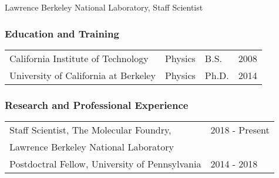 Lawrence Berkeley National Laboratory,
Staff Scientist

\subsubsection*{Education and Training}

\begin{table}[ht]
    \centering
    \begin{tabular}{llll}
        California Institute of Technology & Physics & B.S. & 2008 \\
        University of California at Berkeley & Physics & Ph.D. & 2014 \\
    \end{tabular}
\end{table}

\subsubsection*{Research and Professional Experience}

\begin{table}[ht]
    \centering
    \begin{tabular}{ll}
        Staff Scientist, The Molecular Foundry,  & 2018 - Present   \\
        Lawrence Berkeley National Laboratory & \\
        Postdoctral Fellow, University of Pennsylvania & 2014 - 2018 \\
    \end{tabular}
\end{table}

